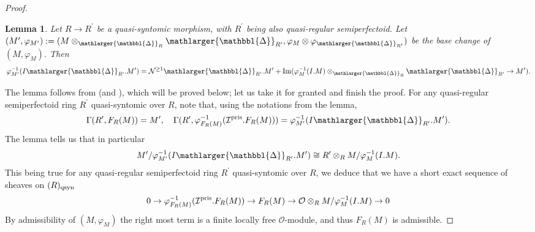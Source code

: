 \documentclass{amsart}
\newcommand{\prism}{{\mathlarger{\mathbbl{\Delta}}}}
\theoremstyle{plain}
\newtheorem{lemma}[theorem]{Lemma}
\theoremstyle{definition}
\newcommand{\blue}[1]{{\color{black}#1}}
\begin{document}
{\begin{proof}
\begin{lemma}
Let $R \to R^\prime$ be a quasi-syntomic morphism, with $R^\prime$ being also quasi-regular semiperfectoid. Let $(M^\prime, \varphi_{M^\prime}):=(M\otimes_{\prism_R} \prism_{R^\prime}, \varphi_M \otimes \varphi_{\prism_{R^\prime}})$ be the base change of $(M,\varphi_M)$. Then 
$$
\varphi_{M^\prime}^{-1}(I\prism_{R^\prime}. M^\prime) = \mathcal{N}^{\geq 1} \prism_{R^\prime}. M^\prime + \mathrm{Im}(\varphi_M^{-1}(I.M) \otimes_{\prism_R} \prism_{R^\prime} \to M^\prime). 
$$
\end{lemma}
The lemma follows from  (and ), which will be proved below; let us take it for granted and finish the proof. For any quasi-regular semiperfectoid ring $R^\prime$ quasi-syntomic over $R$, note that, using the notations from the lemma,
$$
\Gamma(R^\prime, F_R(M)) = M^\prime, \quad \Gamma(R^\prime, \varphi_{F_R(M)}^{-1}(\mathcal{I}^{\rm pris}.F_R(M))) =  \varphi_{M^\prime}^{-1}(I\prism_{R^\prime}. M^\prime). 
$$
The lemma tells us that in particular
$$
M^\prime/ \varphi_{M^\prime}^{-1}(I\prism_{R^\prime}. M^\prime) \cong R^\prime \otimes_R M/\varphi_M^{-1}(I.M).
$$
This being true for any quasi-regular semiperfectoid ring $R^\prime$ quasi-syntomic over $R$, we deduce that we have a short exact sequence of sheaves on $(R)_{\rm qsyn}$
$$ 
0 \to \varphi_{F_R(M)}^{-1}(\mathcal{I}^{\rm pris}.F_R(M)) \to F_R(M) \to \mathcal{O} \otimes_R M/\varphi_M^{-1}(I.M) \to 0
$$ 
By admissibility of $(M,\varphi_M)$ the right most term is a finite locally free $\mathcal{O}$-module, and thus \blue{$F_R(M)$} is admissible. 


\end{proof}}
\end{document}
